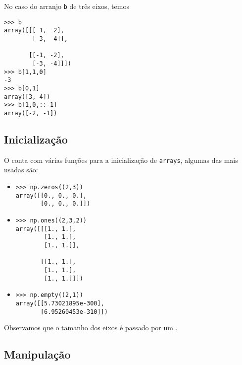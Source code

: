 No caso do arranjo \lstinline+b+ de três eixos, temos

\begin{lstlisting}
>>> b
array([[[ 1,  2],
        [ 3,  4]],

       [[-1, -2],
        [-3, -4]]])
>>> b[1,1,0]
-3
>>> b[0,1]
array([3, 4])
>>> b[1,0,::-1]
array([-2, -1])
\end{lstlisting}

\subsection{Inicialização}

O {\numpy} conta com várias funções para a inicialização de \texttt{arrays}, algumas das mais usadas são:
\begin{itemize}
\item {\PYTHONnumpyDOTzeros} 

\begin{lstlisting}[xrightmargin=2.5em]
>>> np.zeros((2,3))
array([[0., 0., 0.],
       [0., 0., 0.]])
\end{lstlisting}

\item {\PYTHONnumpyDOTones} 

\begin{lstlisting}[xrightmargin=2.5em]
>>> np.ones((2,3,2))
array([[[1., 1.],
        [1., 1.],
        [1., 1.]],

       [[1., 1.],
        [1., 1.],
        [1., 1.]]])
\end{lstlisting}

\item {\PYTHONnumpyDOTempty} 

\begin{lstlisting}[xrightmargin=2.5em]
>>> np.empty((2,1))
array([[5.73021895e-300],
       [6.95260453e-310]])
\end{lstlisting}

\end{itemize}
Observamos que o tamanho dos eixos é passado por um {\PYTHONtuple}.

\subsection{Manipulação}

